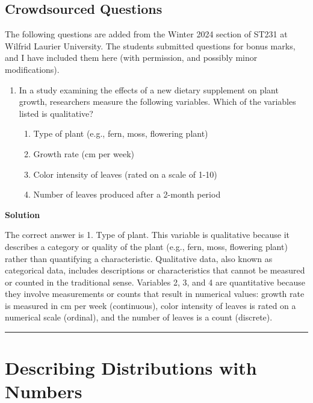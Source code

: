 \documentclass[
  letterpaper,
  DIV=11,
  numbers=noendperiod,
  oneside]{scrreprt}
\providecommand{\tightlist}{%
  \setlength{\itemsep}{0pt}\setlength{\parskip}{0pt}}\usepackage{longtable,booktabs,array}
\begin{document}
\hypertarget{crowdsourced-questions}{%
\section{Crowdsourced Questions}\label{crowdsourced-questions}}

The following questions are added from the Winter 2024 section of ST231
at Wilfrid Laurier University. The students submitted questions for
bonus marks, and I have included them here (with permission, and
possibly minor modifications).

\begin{enumerate}
\def\labelenumi{\arabic{enumi}.}
\tightlist
\item
  In a study examining the effects of a new dietary supplement on plant
  growth, researchers measure the following variables. Which of the
  variables listed is qualitative?

  \begin{enumerate}
  \def\labelenumii{\alph{enumii}.}
  \tightlist
  \item
    Type of plant (e.g., fern, moss, flowering plant)
  \item
    Growth rate (cm per week)
  \item
    Color intensity of leaves (rated on a scale of 1-10)
  \item
    Number of leaves produced after a 2-month period
  \end{enumerate}
\end{enumerate}

\textbf{Solution}

The correct answer is 1. Type of plant. This variable is qualitative
because it describes a category or quality of the plant (e.g., fern,
moss, flowering plant) rather than quantifying a characteristic.
Qualitative data, also known as categorical data, includes descriptions
or characteristics that cannot be measured or counted in the traditional
sense. Variables 2, 3, and 4 are quantitative because they involve
measurements or counts that result in numerical values: growth rate is
measured in cm per week (continuous), color intensity of leaves is rated
on a numerical scale (ordinal), and the number of leaves is a count
(discrete).

\begin{center}\rule{0.5\linewidth}{0.5pt}\end{center}

\hypertarget{describing-distributions-with-numbers}{%
\chapter{Describing Distributions with
Numbers}\label{describing-distributions-with-numbers}}
\end{document}
